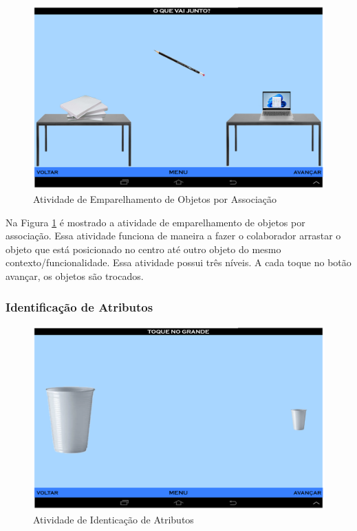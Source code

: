 \documentclass[12pt]{article}
\begin{document}
 \begin{figure}[h!]
    \centering
    \includegraphics[width=1.0\textwidth]{emparelhamento_obj_assoc.png}
    \caption{Atividade de Emparelhamento de Objetos por Associação}
    \label{fig:emparObjAssoc}
\end{figure}
Na Figura \ref{fig:emparObjAssoc} é mostrado a atividade de emparelhamento de objetos por associação. Essa atividade funciona de maneira a fazer o colaborador arrastar o objeto que está posicionado no centro até outro objeto do mesmo contexto/funcionalidade. Essa atividade possui três níveis. A cada toque no botão avançar, os objetos são trocados.

\subsubsection{Identificação de Atributos}

 \begin{figure}[h!]
    \centering
    \includegraphics[width=1.0\textwidth]{identificacao_atr.png}
    \caption{ Atividade de Identicação de Atributos }
    \label{fig:identificacaoAtr}
\end{figure}
\end{document}
